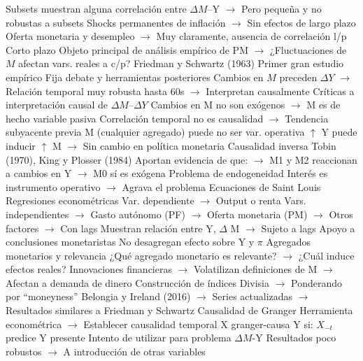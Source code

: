 \documentclass{nuevotema}
\begin{document}
\begin{esquemal}
				\4[] Subsets muestran alguna correlación entre $\Delta M$--Y
				\4[] $\to$ Pero pequeña y no robustas a subsets
				\4[] Shocks permanentes de inflación
				\4[] $\to$ Sin efectos de largo plazo
				\4[] Oferta monetaria y desempleo
				\4[] $\to$ Muy claramente, ausencia de correlación l/p
			\3 Corto plazo
				\4 Objeto principal de análisis empírico de PM
				\4[] $\to$ ¿Fluctuaciones de $M$ afectan vars. reales a c/p?
				\4 Friedman y Schwartz (1963)
				\4[] Primer gran estudio empírico
				\4[] Fija debate y herramientas posteriores
				\4[] Cambios en $M$ preceden $\Delta Y$
				\4[] $\to$ Relación temporal muy robusta hasta 60s
				\4[] $\to$ Interpretan causalmente
				\4 Críticas a interpretación causal de $\Delta M$--$\Delta Y$
				\4[] Cambios en M no son exógenos
				\4[] $\to$ M es de hecho variable pasiva
				\4[] Correlación temporal no es causalidad
				\4[] $\to$ Tendencia subyacente previa
				\4[] M (cualquier agregado) puede no ser var. operativa
				\4[] $\uparrow$ Y puede inducir $\uparrow$ M
				\4[] $\to$ Sin cambio en política monetaria
				\4 Causalidad inversa
				\4[] Tobin (1970), King y Plosser (1984)
				\4[] Aportan evidencia de que:
				\4[] $\to$ M1 y M2 reaccionan a cambios en Y
				\4[] $\to$ M0 sí es exógena
				\4 Problema de endogeneidad
				\4[] Interés es instrumento operativo
				\4[] $\to$ Agrava el problema
				\4 Ecuaciones de Saint Louis
				\4[] Regresiones econométricas
				\4[] Var. dependiente
				\4[] $\to$ Output o renta
				\4[] Vars. independientes
				\4[] $\to$ Gasto autónomo (PF)
				\4[] $\to$ Oferta monetaria (PM)
				\4[] $\to$ Otros factores
				\4[] $\to$ Con lags
				\4[] Muestran relación entre Y, $\Delta$ M
				\4[] $\to$ Sujeto a lags
				\4[] Apoyo a conclusiones monetaristas
				\4[] No desagregan efecto sobre Y y $\pi$
				\4 Agregados monetarios y relevancia
				\4[] ¿Qué agregado monetario es relevante?
				\4[] $\to$ ¿Cuál induce efectos reales?
				\4[] Innovaciones financieras
				\4[] $\to$ Volatilizan definiciones de M
				\4[] $\to$ Afectan a demanda de dinero
				\4[] Construcción de índices Divisia
				\4[] $\to$ Ponderando por ``moneyness''
				\4[] Belongia y Ireland (2016)
				\4[] $\to$ Series actualizadas
				\4[] $\to$ Resultados similares a Friedman y Schwartz
				\4 Causalidad de Granger
				\4[] Herramienta econométrica
				\4[] $\to$ Establecer causalidad temporal
				\4[] X granger-causa Y si:
				\4[] $X_{-t}$ predice Y presente
				\4[] Intento de utilizar para problema $\Delta M$-Y
				\4[] Resultados poco robustos
				\4[] $\to$ A introducción de otras variables

\end{esquemal}
\end{document}
